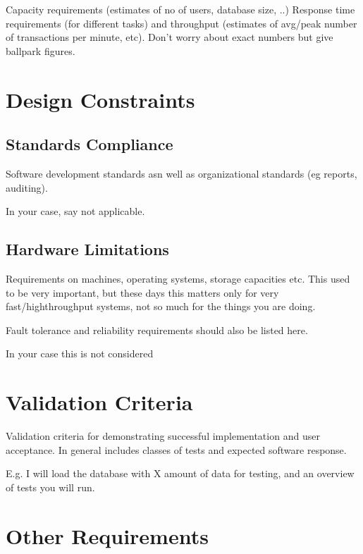 \documentclass[a4wide]{article}
\begin{document}
Capacity requirements (estimates of no of users, database size, ..)
Response time requirements (for different tasks)
and throughput (estimates of avg/peak number of transactions per minute, etc).
Don't worry about exact numbers but give ballpark figures.

 

\section{Design Constraints}

\subsection{Standards Compliance}

Software development standards asn well as organizational standards
(eg reports, auditing).

In your case, say not applicable.

\subsection{Hardware Limitations}

Requirements on machines, operating systems, storage capacities etc.
This used to be very important, but these days this matters only
for very fast/highthroughput systems, not so much for the things you
are doing.

Fault tolerance and reliability requirements should also be listed here.

In your case this is not considered
 

\section{Validation Criteria}

Validation criteria for demonstrating 
successful implementation and user acceptance.  
In general includes classes of tests and expected software response.

E.g. I will load the database with X amount of data for testing,
and an overview of tests you will run.


\section{Other Requirements}
\end{document}
